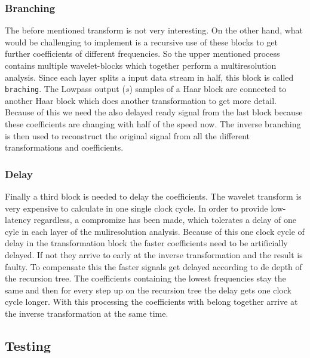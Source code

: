 \begin{refsection}

\subsubsection{Branching}

The before mentioned transform is not very interesting. On the other hand, what would be challenging to implement is a recursive use of these blocks to get further coefficients of different frequencies.
So the upper mentioned process contains multiple wavelet-blocks which together perform a multiresolution analysis.
Since each layer splits a input data stream in half, this block is called \texttt{braching}.
The Lowpass output ($s$) samples of a Haar block are connected to another Haar block which does another transformation to get more detail. 
Because of this we need the also delayed ready signal from the last block because these coefficients are changing with half of the speed now. 
The inverse branching is then used to reconstruct the original signal from all the different transformations and coefficients.

\subsubsection{Delay}

Finally a third block is needed to delay the coefficients.
The wavelet transform is very expensive to calculate in one single clock cycle.
In order to provide low-latency regardless, a compromize has been made, which tolerates a delay of one cyle in each layer of the muliresolution analysis.
Because of this one clock cycle of delay in the transformation block the faster coefficients need to be artificially delayed.
If not they arrive to early at the inverse transformation and the result is faulty. To compensate this the   faster signals get delayed according to de depth of the recursion tree.
The coefficients containing the lowest frequencies stay the same and then for every step up on the recursion tree the delay gets one clock cycle longer.
With this processing the coefficients with belong together arrive at the inverse transformation at the same time.




\subsection{Testing}


\end{refsection}
